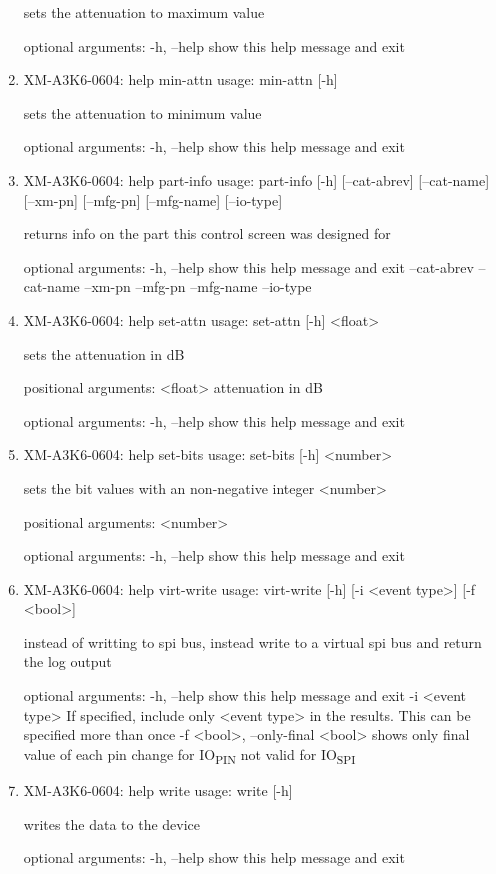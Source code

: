 \documentclass[11pt]{article}
\begin{document}
\begin{enumerate}
sets the attenuation to maximum value

optional arguments:
  -h, --help  show this help message and exit

\item XM-A3K6-0604: help min-attn
\label{sec:org408203b}
usage: min-attn [-h]

sets the attenuation to minimum value

optional arguments:
  -h, --help  show this help message and exit

\item XM-A3K6-0604: help part-info
\label{sec:orgba5f2cd}
usage: part-info  [-h] [--cat-abrev] [--cat-name] [--xm-pn] [--mfg-pn] [--mfg-name]
        [--io-type]

returns info on the part this control screen was designed for

optional arguments:
  -h, --help   show this help message and exit
  --cat-abrev
  --cat-name
  --xm-pn
  --mfg-pn
  --mfg-name
  --io-type

\item XM-A3K6-0604: help set-attn
\label{sec:org054922c}
usage: set-attn [-h] <float>

sets the attenuation in dB

positional arguments:
  <float>     attenuation in dB

optional arguments:
  -h, --help  show this help message and exit

\item XM-A3K6-0604: help set-bits
\label{sec:org1ac2e9b}
usage: set-bits [-h] <number>

sets the bit values with an non-negative integer <number>

positional arguments:
  <number>

optional arguments:
  -h, --help  show this help message and exit

\item XM-A3K6-0604: help virt-write
\label{sec:org33b17de}
usage: virt-write [-h] [-i <event type>] [-f <bool>]

instead of writting to spi bus, instead write to a virtual spi bus and return
the log output

optional arguments:
  -h, --help            show this help message and exit
  -i <event type>       If specified, include only <event type> in the
                        results. This can be specified more than once
  -f <bool>, --only-final <bool>
                        shows only final value of each pin change for IO\textsubscript{PIN}
                        not valid for IO\textsubscript{SPI}

\item XM-A3K6-0604: help write
\label{sec:org77b8b7b}
usage: write [-h]

writes the data to the device

optional arguments:
  -h, --help  show this help message and exit
\end{enumerate}
\end{document}
